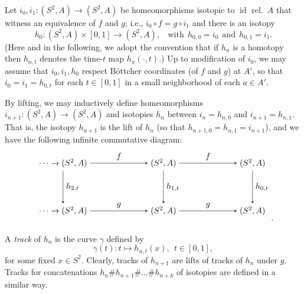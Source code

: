 \documentclass{amsart}
\theoremstyle{plain}
\theoremstyle{definition}
\theoremstyle{remark}
\newcommand{\id}{\operatorname{id}}
\newcommand{\reminder}[1]{\textsl{$\lhd\rhd$#1$\lhd\rhd$}\marginpar{$\lhd\rhd\lhd\rhd\lhd\rhd$}}%
\newcommand{\hide}[1]{}
\renewcommand{\sp}{{\ \ }}
\newcommand{\UU}{{\mathcal U}}
\begin{document}
Let $i_0, i_1\colon (S^2,A)\to (S^2,A)$ be homeomorphisms isotopic to $\id$ rel.\ $A$ that witness an equivalence of $f$ and $g$; i.e., $i_0\circ f= g\circ i_1$ and there is an isotopy \[h_{0}\colon (S^2,A)\times [0,1] \to (S^2,A), %
\sp\sp \text{with} \sp h_{0,0}=i_0 \sp \text{and} \sp h_{0,1}=i_1.\]
(Here and in the following, we adopt the convention that if $h_n$ is a homotopy then $h_{n,t}$ denotes the time-$t$ map $h_n(\cdot, t)$.) Up to modification of $i_0$, we may assume that $i_0,i_1,h_0$ respect B\"{o}ttcher coordinates (of $f$ and $g$) at $A'$, so that $i_0=i_1=h_{0,t}$ for each $t\in[0,1]$ in a small neighborhood of each $a\in A'$.

By lifting, we may inductively define homeomorphisms $i_{n+1}\colon (S^2,A)\to (S^2,A)$ and isotopies $h_{n}$ between $i_{n}=h_{n,0}$ and $i_{n+1}=h_{n,1}$. That is, the isotopy $h_{n+1}$ is the lift of $h_{n}$ (so that $h_{n+1,0}=h_{n,1}=i_{n+1}$), and we have the following infinite commutative diagram:
\[
{\begin{tikzpicture}
  \matrix (m) [matrix of math nodes,row sep=4em,column sep=7em,minimum width=2em]
  {
    \cdots \rightarrow (S^2,  A) &  (S^2,  A) & (S^2,  A) \\
    \cdots \rightarrow  (S^2,  A) &(S^2,  A) & (S^2,A) \\};
  \path[-stealth]
    (m-1-1) edge node [right] {$h_{2,t}$} (m-2-1)
    (m-1-2) edge node [right] {$h_{1,t}$} (m-2-2)
    (m-1-3) edge node [right] {$h_{0,t}$} (m-2-3)

      (m-1-1)  edge     node [above] {$f $} (m-1-2)
             (m-1-2)    edge  node [above] {$f $} (m-1-3)
 
    (m-2-1.east|-m-2-2) edge node [above] {$g$}
          (m-2-2)
        (m-2-2.east|-m-2-3) edge node [above] {$g$}
          (m-2-3);
\end{tikzpicture}}.
\]

A \emph{track} of $h_{n}$ is the curve $\gamma$ defined by \[\gamma(t) \colon t\mapsto h_{n,t}(x),\sp t\in [0,1],\]%
for some fixed $x\in S^2$. Clearly, tracks of $h_{n+1}$ are lifts of tracks of $h_{n}$ under $g$. Tracks for concatenations $h_{n}\#h_{n+1}\#\dots \#h_{n+k}$ of isotopies are defined in a similar way.

\end{document}
